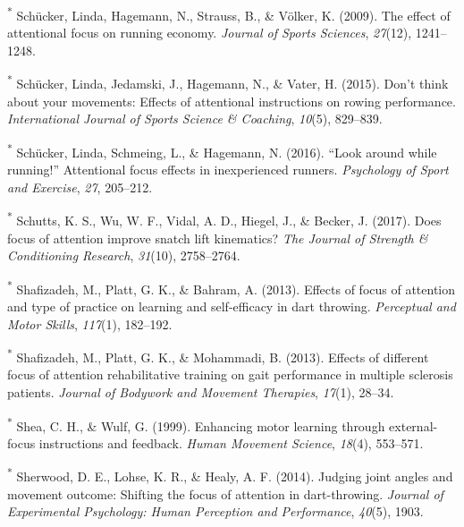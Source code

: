 \documentclass[
  man, donotrepeattitle,floatsintext]{apa7}
\newlength{\cslhangindent}
\newlength{\cslentryspacingunit} %
\newenvironment{CSLReferences}[2] %
 {%
  \setlength{\parindent}{0pt}
  \ifodd #1
  \let\oldpar\par
  \def\par{\hangindent=\cslhangindent\oldpar}
  \fi
  \setlength{\parskip}{#2\cslentryspacingunit}
 }%
 {}
\begin{document}
\begin{CSLReferences}{1}{0}
\leavevmode{}%
\textsuperscript{*} Schücker, Linda, Hagemann, N., Strauss, B., \& Völker, K. (2009). The effect of attentional focus on running economy. \emph{Journal of Sports Sciences}, \emph{27}(12), 1241--1248.

\leavevmode{}%
\textsuperscript{*} Schücker, Linda, Jedamski, J., Hagemann, N., \& Vater, H. (2015). Don't think about your movements: Effects of attentional instructions on rowing performance. \emph{International Journal of Sports Science \& Coaching}, \emph{10}(5), 829--839.

\leavevmode{}%
\textsuperscript{*} Schücker, Linda, Schmeing, L., \& Hagemann, N. (2016). {``Look around while running!''} Attentional focus effects in inexperienced runners. \emph{Psychology of Sport and Exercise}, \emph{27}, 205--212.

\leavevmode{}%
\textsuperscript{*} Schutts, K. S., Wu, W. F., Vidal, A. D., Hiegel, J., \& Becker, J. (2017). Does focus of attention improve snatch lift kinematics? \emph{The Journal of Strength \& Conditioning Research}, \emph{31}(10), 2758--2764.

\leavevmode{}%
\textsuperscript{*} Shafizadeh, M., Platt, G. K., \& Bahram, A. (2013). Effects of focus of attention and type of practice on learning and self-efficacy in dart throwing. \emph{Perceptual and Motor Skills}, \emph{117}(1), 182--192.

\leavevmode{}%
\textsuperscript{*} Shafizadeh, M., Platt, G. K., \& Mohammadi, B. (2013). Effects of different focus of attention rehabilitative training on gait performance in multiple sclerosis patients. \emph{Journal of Bodywork and Movement Therapies}, \emph{17}(1), 28--34.

\leavevmode{}%
\textsuperscript{*} Shea, C. H., \& Wulf, G. (1999). Enhancing motor learning through external-focus instructions and feedback. \emph{Human Movement Science}, \emph{18}(4), 553--571.

\leavevmode{}%
\textsuperscript{*} Sherwood, D. E., Lohse, K. R., \& Healy, A. F. (2014). Judging joint angles and movement outcome: Shifting the focus of attention in dart-throwing. \emph{Journal of Experimental Psychology: Human Perception and Performance}, \emph{40}(5), 1903.


\end{CSLReferences}
\end{document}
